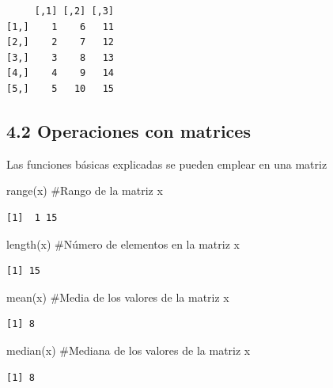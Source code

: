 \documentclass[
  letterpaper,
  DIV=11,
  numbers=noendperiod]{scrreprt}
\newenvironment{Shaded}{\begin{snugshade}}{\end{snugshade}}
\newcommand{\CommentTok}[1]{\textcolor[rgb]{0.37,0.37,0.37}{#1}}
\newcommand{\FunctionTok}[1]{\textcolor[rgb]{0.28,0.35,0.67}{#1}}
\newcommand{\NormalTok}[1]{\textcolor[rgb]{0.00,0.23,0.31}{#1}}
\begin{document}
\begin{verbatim}
     [,1] [,2] [,3]
[1,]    1    6   11
[2,]    2    7   12
[3,]    3    8   13
[4,]    4    9   14
[5,]    5   10   15
\end{verbatim}

\hypertarget{operaciones-con-matrices}{%
\subsection{4.2 Operaciones con
matrices}\label{operaciones-con-matrices}}

Las funciones básicas explicadas se pueden emplear en una matriz

\begin{Shaded}
\begin{Highlighting}[]
\FunctionTok{range}\NormalTok{(x) }\CommentTok{\#Rango de la matriz x}
\end{Highlighting}
\end{Shaded}

\begin{verbatim}
[1]  1 15
\end{verbatim}

\begin{Shaded}
\begin{Highlighting}[]
\FunctionTok{length}\NormalTok{(x) }\CommentTok{\#Número de elementos en la matriz x}
\end{Highlighting}
\end{Shaded}

\begin{verbatim}
[1] 15
\end{verbatim}

\begin{Shaded}
\begin{Highlighting}[]
\FunctionTok{mean}\NormalTok{(x) }\CommentTok{\#Media de los valores de la matriz x}
\end{Highlighting}
\end{Shaded}

\begin{verbatim}
[1] 8
\end{verbatim}

\begin{Shaded}
\begin{Highlighting}[]
\FunctionTok{median}\NormalTok{(x) }\CommentTok{\#Mediana de los valores de la matriz x}
\end{Highlighting}
\end{Shaded}

\begin{verbatim}
[1] 8
\end{verbatim}
\end{document}
